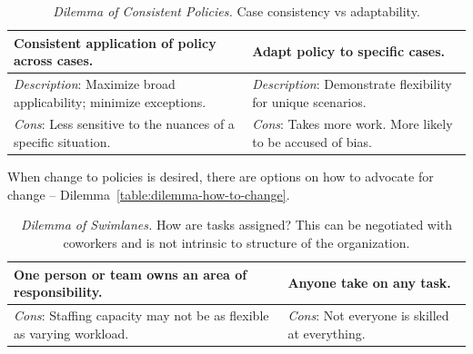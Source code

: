 \begin{center}
\begin{table}[H] %
\begin{tabular}{ | m{\dilemmatablewidth}| m{\dilemmatablewidth} | }
  \hline
  \textbf{Consistent application of policy across cases.} &
  \textbf{Adapt policy to specific cases.} \\
  \hline
  \textit{Description}: Maximize broad applicability; minimize exceptions. &
  \textit{Description}: Demonstrate flexibility for unique scenarios. \\  
  \hline
  \textit{Cons}: Less sensitive to the nuances of a specific situation. & 
  \textit{Cons}: Takes more work. More likely to be accused of bias. \\
  \hline
\end{tabular}
\caption{
\textit{Dilemma of Consistent Policies.}
Case consistency vs adaptability.
}
\label{table:dilemma-personal-policy-consistency-across-cases}
\end{table}
\end{center}

When change to policies is desired, there are options on how to advocate for change -- Dilemma~\ref{table:dilemma-how-to-change}.



\begin{center}
\begin{table}[H] %
\begin{tabular}{ | m{\dilemmatablewidth}| m{\dilemmatablewidth} | } 
  \hline
  \textbf{One person or team owns an area of responsibility.} & 
  \textbf{Anyone take on any task.} \\ 
  \hline
  \textit{Cons}: Staffing capacity may not be as flexible as varying workload. & 
  \textit{Cons}: Not everyone is skilled at everything. \\  
  \hline
\end{tabular}
\caption{
\textit{Dilemma of Swimlanes.} 
How are tasks assigned? This can be negotiated with coworkers and is not intrinsic to structure of the organization. 
}
\label{table:dilemma-personal-swimlanes}
\end{table}
\end{center}


